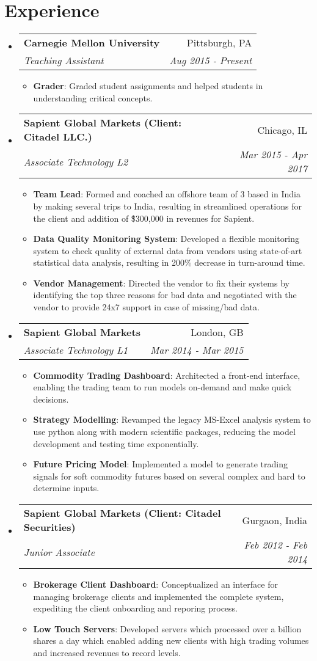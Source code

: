 \documentclass[letterpaper,10.8pt]{article}
\makeatletter
\newcommand{\resumeItem}[2]{
  \item\small{
    \textbf{#1}{: #2 \vspace{-2pt}}
  }
}
\newcommand{\resumeSubheading}[4]{
  \vspace{-1pt}\item
    \begin{tabular*}{0.97\textwidth}{l@{\extracolsep{\fill}}r}
      \textbf{#1} & #2 \\
      \textit{\small#3} & \textit{\small #4} \\
    \end{tabular*}\vspace{-5pt}
}
\newcommand{\resumeSubHeadingListStart}{\begin{itemize}[leftmargin=*]}
\newcommand{\resumeSubHeadingListEnd}{\end{itemize}}
\newcommand{\resumeItemListStart}{\begin{itemize}}
\newcommand{\resumeItemListEnd}{\end{itemize}\vspace{-5pt}}
\makeatother
\begin{document}
\section{Experience}
  \resumeSubHeadingListStart
	 \resumeSubheading
	{Carnegie Mellon University}{Pittsburgh, PA}
	{Teaching Assistant}{Aug 2015 -  Present}
	\resumeItemListStart
	\resumeItem{Grader}
	{Graded student assignments and helped students in understanding critical concepts.}
	\resumeItemListEnd
	
    \resumeSubheading
      {Sapient Global Markets (Client: Citadel LLC.)}{Chicago, IL}
      {Associate Technology L2}{Mar 2015 - Apr 2017}
      \resumeItemListStart
        \resumeItem{Team Lead}
          {Formed and coached an offshore team of 3 based in India by making several trips to India, resulting in streamlined operations for the client and addition of \~\$300,000 in revenues for Sapient.}
          \resumeItem{Data Quality Monitoring System}
          {Developed a flexible monitoring system to check quality of external data from vendors using state-of-art statistical data analysis, resulting in 200\% decrease in turn-around time.}
          \resumeItem{Vendor Management}{Directed the vendor to fix their systems by identifying the top three reasons for bad data and negotiated with the vendor to provide 24x7 support in case of missing/bad data.}
      \resumeItemListEnd

    \resumeSubheading
	{Sapient Global Markets}{London, GB}
	{Associate Technology L1}{Mar 2014 - Mar 2015}
    \resumeItemListStart
    \resumeItem{Commodity Trading Dashboard}
    {Architected a front-end interface, enabling the trading team to run models on-demand and make quick decisions.}
    \resumeItem{Strategy Modelling}
    {Revamped the legacy MS-Excel analysis system to use python along with modern scientific packages, reducing the model development and testing time exponentially.}
    \resumeItem{Future Pricing Model}{Implemented a model to generate trading signals for soft commodity futures based on several complex and hard to determine inputs.}
    \resumeItemListEnd

    \resumeSubheading
    {Sapient Global Markets (Client: Citadel Securities)}{Gurgaon, India}
    {Junior Associate}{Feb 2012 - Feb 2014}
    \resumeItemListStart
    \resumeItem{Brokerage Client Dashboard}
    {Conceptualized an interface for managing brokerage clients and implemented the complete system, expediting the client onboarding and reporing process.}
    \resumeItem{Low Touch Servers}{Developed servers which processed over a billion shares a day which enabled adding new clients with high trading volumes and increased revenues to record levels.}
    \resumeItemListEnd
\resumeSubHeadingListEnd
\end{document}
